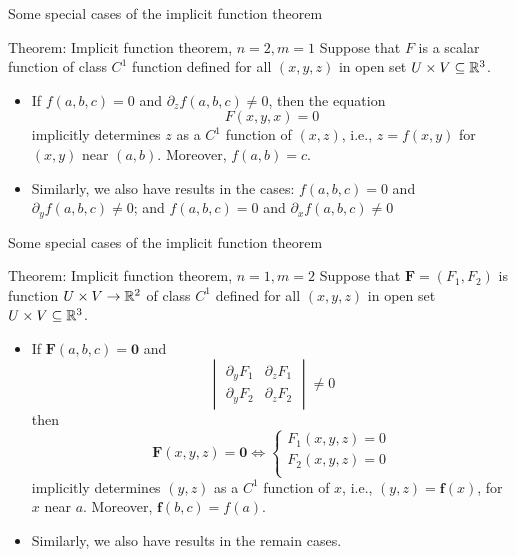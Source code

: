 \begin{frame}{Some special cases of the implicit function theorem}
    \begin{block}{Theorem: Implicit function theorem, $n=2, m=1$}
    Suppose that $F$ is a scalar function of class $C^1$ function defined for all $(x, y, z)$ in open set $U\times V \subseteq \mathbb{R}^3$.
    \begin{itemize}
        \item If $f(a, b, c) = 0$ and $\partial_zf(a, b, c) \ne 0$, then the equation
            \begin{equation}
                F(x, y, x) = 0
            \end{equation}
            implicitly determines $z$ as a $C^1$ function of $(x, z)$, i.e., $z = f(x, y)$ for $(x, y)$ near $(a, b)$. Moreover, $f(a, b) = c$.
        \item Similarly, we also have results in the cases: $f(a, b, c) = 0$ and $\partial_yf(a, b, c) \ne 0$; and $f(a, b, c) = 0$ and $\partial_xf(a, b, c) \ne 0$
    \end{itemize}
    \end{block}
\end{frame}

\begin{frame}{Some special cases of the implicit function theorem}
    \begin{block}{Theorem: Implicit function theorem, $n=1, m=2$}
    Suppose that $\mathbf{F} = (F_1, F_2)$ is function $U \times V \rightarrow \mathbb{R}^2$ of class $C^1$ defined for all $(x, y, z)$ in open set $U\times V \subseteq \mathbb{R}^3$.
    \begin{itemize}
        \item If $\mathbf{F}(a, b, c) = \mathbf{0}$ and 
        \begin{equation}
            \begin{vmatrix}
             \partial_yF_1 & \partial_zF_1\\ 
             \partial_yF_2 & \partial_zF_2
            \end{vmatrix} \ne 0
        \end{equation} 
        then
        \begin{equation}
            \mathbf{F}(x, y, z) = \mathbf{0} \Leftrightarrow \begin{cases}
                F_1(x, y, z) = 0\\
                F_2(x, y, z) = 0\\
            \end{cases}
        \end{equation}
        implicitly determines $(y, z)$ as a $C^1$ function of $x$, i.e., $(y, z) = \mathbf{f}(x)$, for $x$ near $a$. Moreover, $\mathbf{f}(b, c) = f(a)$.
        \item Similarly, we also have results in the remain cases.
    \end{itemize}
    \end{block}
\end{frame}

